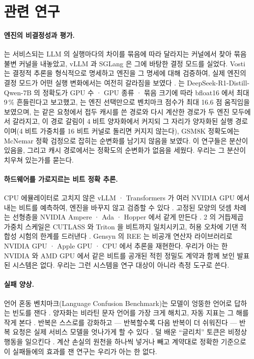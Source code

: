 \documentclass[11pt]{article}
\begin{document}
\section{관련 연구}\label{sec:related}

\paragraph{엔진의 비결정성과 평가.}
\citet{he2025} 는 서비스되는 LLM 의 실행마다의 차이를 묶음에 따라 달라지는 커널에서 찾아 묶음 불변 커널을 내놓았고, vLLM 과
SGLang 은 그에 바탕한 결정 모드를 실었다. Vosti 는 결정적 추론을 형식적으로 명세하고 엔진을 그 명세에 대해 검증하여, 실제
엔진의 결정 모드가 어떤 실행 변화에서는 여전히 갈라짐을 보였다 \citep{qin2026}. \citet{yuan2025} 는
DeepSeek-R1-Distill-Qwen-7B 의 정확도가 GPU 수 · GPU 종류 · 묶음 크기에 따라 bfloat16 에서 최대 9\,\% 흔들린다고 보고했고,
\citet{pape2026} 는 엔진 선택만으로 벤치마크 점수가 최대 16.6 점 움직임을 보였으며, \citet{patodiya2026} 는 같은 요청에서
접두 캐시를 쓴 경로와 다시 계산한 경로가 두 엔진 모두에서 갈라지고, 이 경로 갈림이 4 비트 양자화에서 커지되 그 자리가
양자화된 실행 경로이며(4 비트 가중치를 16 비트 커널로 돌리면 커지지 않는다), GSM8K 정확도에는 McNemar 정확 검정으로 잡히는
순변화를 남기지 않음을 보였다. 이 연구들은 분산이 있음을, 그리고 캐시 경로에서는 정확도의 순변화가 없음을 세웠다. 우리는 그
분산이 치우쳐 있는가를 묻는다.

\paragraph{하드웨어를 가로지르는 비트 정확 추론.}
CPU 에뮬레이터로 고치지 않은 vLLM · Transformers 가 여러 NVIDIA GPU 에서 내는 비트를 예측하여, 엔진을 바꾸지 않고 검증할 수
있다 \citep{bitexact2026}. 고정된 모양의 덧셈 차례는 선형층을 NVIDIA Ampere · Ada · Hopper 에서 같게 만든다 \citep{cooper2026}.
2 의 거듭제곱 가중치 스케일은 CUTLASS 와 Triton 을 비트까지 일치시키고, 허용 오차에 기댄 적합성 시험의 한계를 드러낸다
\citep{chen2026}. Gensyn 의 REE 는 비공개 연산자 라이브러리로 NVIDIA GPU · Apple GPU · CPU 에서 추론을 재현한다. 우리가 아는 한
NVIDIA 와 AMD GPU 에서 같은 비트를 공개된 적힌 정밀도 계약과 함께 보인 발표된 시스템은 없다. 우리는 그런 시스템을 연구 대상이
아니라 측정 도구로 쓴다.

\paragraph{실패 양상.}
언어 혼동 벤치마크(Language Confusion Benchmark)는 모델이 엉뚱한 언어로 답하는 빈도를 잰다 \citep{marchisio2024a}. 양자화는
비라틴 문자 언어를 가장 크게 해치고, 자동 지표는 그 해를 작게 본다 \citep{marchisio2024b}. 반복은 스스로를 강화하고 ---
반복할수록 다음 반복이 더 쉬워진다 \citep{xu2022} --- 반복 요청은 실제 서비스 모델을 엇나가게 할 수 있다 \citep{nasr2023}.
덜 배운 ``글리치'' 토큰은 비정상 행동을 일으킨다 \citep{land2024}. 계산 손실의 원천을 하나씩 넣거나 빼고 계약대로 정확한
기준으로 이 실패들에의 효과를 잰 연구는 우리가 아는 한 없다.
\end{document}
